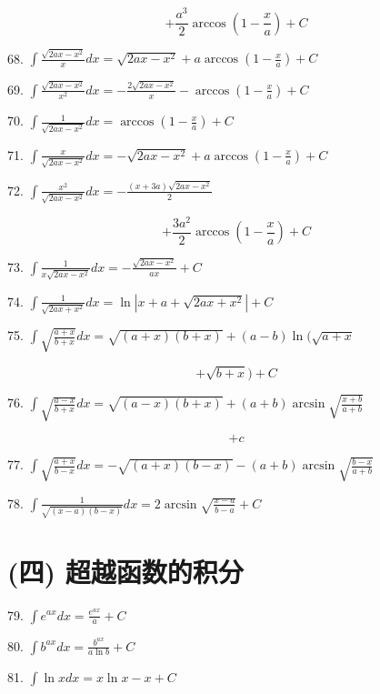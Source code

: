 \documentclass[lang=cn,newtx,10pt,scheme=chinese]{elegantbook}
\begin{document}
\[
+ \frac{{a}^{3}}{2}\arccos \left( {1 - \frac{x}{a}}\right) + C
\]

68. \(\int \frac{\sqrt{{2ax} - {x}^{2}}}{x}{dx} = \sqrt{{2ax} - {x}^{2}} + a\arccos \left( {1 - \frac{x}{a}}\right) + C\)

69. \(\int \frac{\sqrt{{2ax} - {x}^{2}}}{{x}^{2}}{dx} = - \frac{2\sqrt{{2ax} - {x}^{2}}}{x} - \arccos \left( {1 - \frac{x}{a}}\right) + C\)

70. \(\int \frac{1}{\sqrt{{2ax} - {x}^{2}}}{dx} = \arccos \left( {1 - \frac{x}{a}}\right) + C\)

71. \(\int \frac{x}{\sqrt{{2ax} - {x}^{2}}}{dx} = - \sqrt{{2ax} - {x}^{2}} + a\arccos \left( {1 - \frac{x}{a}}\right) + C\)

72. \(\int \frac{{x}^{2}}{\sqrt{{2ax} - {x}^{2}}}{dx} = - \frac{\left( {x + {3a}}\right) \sqrt{{2ax} - {x}^{2}}}{2}\)

\[
+ \frac{3{a}^{2}}{2}\arccos \left( {1 - \frac{x}{a}}\right) + C
\]

73. \(\int \frac{1}{x\sqrt{{2ax} - {x}^{2}}}{dx} = - \frac{\sqrt{{2ax} - {x}^{2}}}{ax} + C\)

74. \(\int \frac{1}{\sqrt{{2ax} + {x}^{2}}}{dx} = \ln \left| {x + a + \sqrt{{2ax} + {x}^{2}}}\right| + C\)

75. \(\int \sqrt{\frac{a + x}{b + x}}{dx} = \sqrt{\left( {a + x}\right) \left( {b + x}\right) } + \left( {a - b}\right) \ln (\sqrt{a + x}\)

\[
+ \sqrt{b + x}) + C
\]

76. \(\int \sqrt{\frac{a - x}{b + x}}{dx} = \sqrt{\left( {a - x}\right) \left( {b + x}\right) } + \left( {a + b}\right) \arcsin \sqrt{\frac{x + b}{a + b}}\)

\[
+ c
\]

77. \(\int \sqrt{\frac{a + x}{b - x}}{dx} = - \sqrt{\left( {a + x}\right) \left( {b - x}\right) } - \left( {a + b}\right) \arcsin \sqrt{\frac{b - x}{a + b}}\)

78. \(\int \frac{1}{\sqrt{\left( {x - a}\right) \left( {b - x}\right) }}{dx} = 2\arcsin \sqrt{\frac{x - a}{b - a}} + C\)

\section*{(四) 超越函数的积分}

79. \(\int {e}^{ax}{dx} = \frac{{e}^{ax}}{a} + C\)

80. \(\int {b}^{ax}{dx} = \frac{{b}^{ax}}{a\ln b} + C\)

81. \(\int \ln {xdx} = x\ln x - x + C\)
\end{document}
